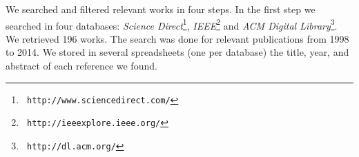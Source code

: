 % 
%  
% 
% 

% 

We searched and filtered relevant works in four steps. 
In the first  step we
searched in four databases: \textit{Science Direct}\footnote{\tt
http://www.sciencedirect.com/}, \textit{IEEE}\footnote{\tt
http://ieeexplore.ieee.org/} and \textit{ACM Digital Library}\footnote{\tt
http://dl.acm.org/}. %
We retrieved 196 works. 
The search was done for relevant publications from 1998 to 2014. 
We stored in several spreadsheets (one per database) the title, year,  and abstract of each reference we found. 

